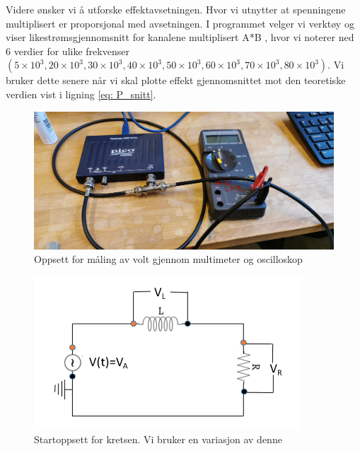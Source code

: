 \documentclass[norsk,a4paper,12pt]{article}
\newcommand{\figurewidth}{10cm}
\begin{document}
Videre ønsker vi å utforske effektavsetningen. Hvor vi utnytter at spenningene multiplisert er proporsjonal med avsetningen. I programmet velger vi verktøy og viser likestrømsgjennomsnitt for kanalene multiplisert A*B , hvor vi noterer ned 6 verdier for ulike frekvenser $(5 \times 10^3, 20 \times 10^3, 30 \times 10^3, 40 \times 10^3, 50 \times 10^3, 60 \times 10^3, 70 \times 10^3, 80 \times 10^3)$. Vi bruker dette senere når vi skal plotte effekt gjennomsnittet mot den teoretiske verdien vist i ligning \ref{eq: P_snitt}.



\begin{figure}[htbp]
    \centering
    \includegraphics[width=1\textwidth]{Figs/Opg1.jpg}
    \caption{Oppsett for måling av volt gjennom multimeter og oscilloskop}
    \label{fig:opg1_oppsett}
\end{figure}


\begin{figure}[htbp]
    \centering
    \includegraphics[width=\figurewidth]{Figs/skjema.png}
    \caption{Startoppsett for kretsen. Vi bruker en variasjon av denne }
    \label{fig:krets}
\end{figure}
\end{document}
